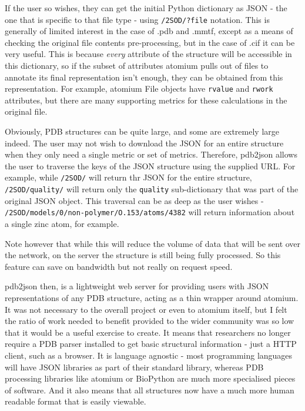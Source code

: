 If the user so wishes, they can get the initial Python dictionary as JSON - the one that is specific to that file type - using \texttt{/2SOD/?file} notation. This is generally of limited interest in the case of .pdb and .mmtf, except as a means of checking the original file contents pre-processing, but in the case of .cif it can be very useful. This is because \emph{every} attribute of the structure will be accessible in this dictionary, so if the subset of attributes atomium pulls out of files to annotate its final representation isn't enough, they can be obtained from this representation. For example, atomium File objects have \texttt{rvalue} and \texttt{rwork} attributes, but there are many supporting metrics for these calculations in the original file.

Obviously, PDB structures can be quite large, and some are extremely large indeed. The user may not wish to download the JSON for an entire structure when they only need a single metric or set of metrics. Therefore, pdb2json allows the user to traverse the keys of the JSON structure using the supplied URL. For example, while \texttt{/2SOD/} will return thr JSON for the entire structure, \texttt{/2SOD/quality/} will return only the \texttt{quality} sub-dictionary that was part of the original JSON object. This traversal can be as deep as the user wishes - \texttt{/2SOD/models/0/non-polymer/O.153/atoms/4382} will return information about a single zinc atom, for example.

Note however that while this will reduce the volume of data that will be sent over the network, on the server the structure is still being fully processed. So this feature can save on bandwidth but not really on request speed.

pdb2json then, is a lightweight web server for providing users with JSON representations of any PDB structure, acting as a thin wrapper around atomium. It was not necessary to the overall project or even to atomium itself, but I felt the ratio of work needed to benefit provided to the wider community was so low that it would be a useful exercise to create. It means that researchers no longer require a PDB parser installed to get basic structural information - just a HTTP client, such as a browser. It is language agnostic - most programming languages will have JSON libraries as part of their standard library, whereas PDB processing libraries like atomium or BioPython are much more specialised pieces of software. And it also means that all structures now have a much more human readable format that is easily viewable.

